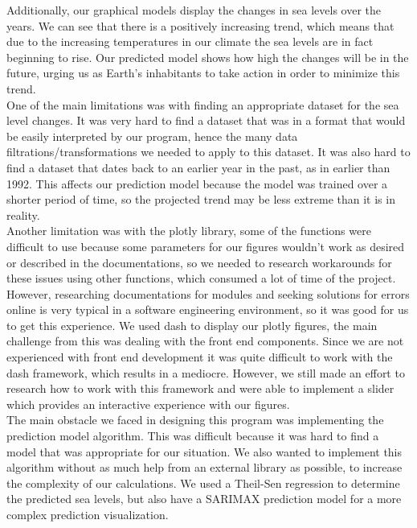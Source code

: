 \documentclass[fontsize=11pt]{article}
\begin{document}
Additionally, our graphical models display the changes in sea levels over the years. We can see that there is a positively increasing trend, which means that due to the increasing temperatures in our climate the sea levels are in fact beginning to rise. Our predicted model shows how high the changes will be in the future, urging us as Earth’s inhabitants to take action in order to minimize this trend. \\

One of the main limitations was with finding an appropriate dataset for the sea level changes. It was very hard to find a dataset that was in a format that would be easily interpreted by our program, hence the many data filtrations/transformations we needed to apply to this dataset. It was also hard to find a dataset that dates back to an earlier year in the past, as in earlier than 1992.  This affects our prediction model because the model was trained over a shorter period of time, so the projected trend may be less extreme than it is in reality. \\

Another limitation was with the plotly library, some of the functions were difficult to use because some parameters for our figures wouldn’t work as desired or described in the documentations, so we needed to research workarounds for these issues using other functions, which consumed a lot of time of the project. However, researching documentations for modules and seeking solutions for errors online is very typical in a software engineering environment, so it was good for us to get this experience. We used dash to display our plotly figures, the main challenge from this was dealing with the front end components. Since we are not experienced with front end development it was quite difficult to work with the dash framework, which results in a mediocre. However, we still made an effort to research how to work with this framework and were able to  implement a slider which provides an interactive experience with our figures. \\

The main obstacle we faced in designing this program was implementing the prediction model algorithm. This was difficult because it was hard to find a model that was appropriate for our situation. We also wanted to implement this algorithm without as much help from an external library as possible, to increase the complexity of our calculations. We used a Theil-Sen regression to determine the predicted sea levels, but also have a SARIMAX prediction model for a more complex prediction visualization. \\
\end{document}
